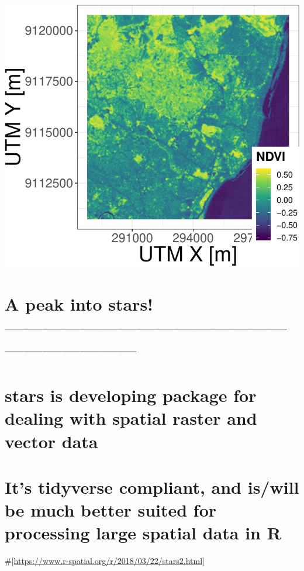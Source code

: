 \documentclass[]{article}
\begin{document}
\includegraphics{R_tidyverse_for_geographers_files/figure-latex/unnamed-chunk-34-2.pdf}

\hypertarget{a-peak-into-stars}{%
\section{A peak into stars!
------------------------------------------------------------------}\label{a-peak-into-stars}}

\hypertarget{stars-is-developing-package-for-dealing-with-spatial-raster-and-vector-data}{%
\section{stars is developing package for dealing with spatial raster and
vector
data}\label{stars-is-developing-package-for-dealing-with-spatial-raster-and-vector-data}}

\hypertarget{its-tidyverse-compliant-and-iswill-be-much-better-suited-for-processing-large-spatial-data-in-r}{%
\section{It's tidyverse compliant, and is/will be much better suited for
processing large spatial data in
R}\label{its-tidyverse-compliant-and-iswill-be-much-better-suited-for-processing-large-spatial-data-in-r}}

\#{[}\url{https://www.r-spatial.org/r/2018/03/22/stars2.html}{]}
\end{document}

